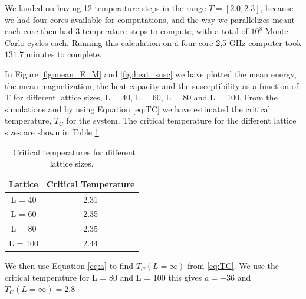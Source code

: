 \documentclass{article}
\begin{document}
{{		We landed on having 12 temperature steps in the range $T = [2.0, 2.3]$, because we had four cores available for computations, and the way we parallelizes meant each core then had 3 temperature steps to compute, with a total of $10^8$ Monte Carlo cycles each. Running this calculation on a four core 2,5 GHz computer took $131.7$ minutes to complete.

		In Figure \ref{fig:mean_E_M} and \ref{fig:heat_susc} we have plotted the mean energy, the mean magnetization, the heat capacity and the susceptibility as a function of T for different lattice sizes, L = 40, L = 60, L = 80 and L = 100. From the simulations and by using Equation \ref{eq:TC} we have estimated the critical temperature, $T_C$ for the system. The critical temperature for the different lattice sizes are shown in Table \ref{Tab:TC}

		{\renewcommand{\arraystretch}{1.5}
		\begin{table}[h!]
			\caption{: Critical temperatures for different lattice sizes.}
				\label{Tab:TC}
				\centering
			\begin{tabular}{c c}
					Lattice & Critical Temperature\\
					\hline
					L = 40 & 2.31 \\
					L = 60 & 2.35 \\
					L = 80 & 2.35 \\
					L = 100	& 2.44 \\
				\hline
			\end{tabular}
		\end{table}

		We then use Equation \ref{eq:a} to find $T_C(L=\infty)$ from \ref{eq:TC}. We use the critical temperature for L = 80 and L = 100 this gives $a = -36$  and $T_C(L=\infty) = 2.8$


}}}
\end{document}
